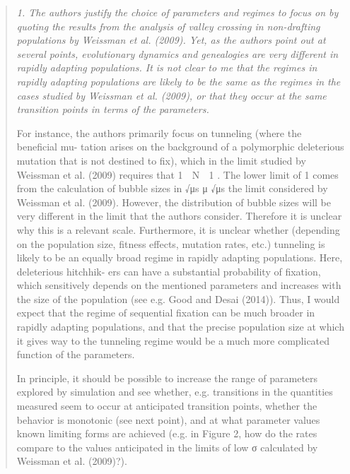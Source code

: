 \documentclass[11pt]{article}
\newenvironment{reviewerquote}{\begin{quote}\color{black}\itshape}{\end{quote}}
\begin{document}
\begin{reviewerquote}
1. The authors justify the choice of parameters and regimes to focus on by quoting the results from the analysis of valley crossing in non-drafting populations by Weissman et al. (2009). Yet, as the authors point out at several points, evolutionary dynamics and genealogies are very different in rapidly adapting populations. It is not clear to me that the regimes in rapidly adapting populations are likely to be the same as the regimes in the cases studied by Weissman et al. (2009), or that they occur at the same transition points in terms of the parameters.

For instance, the authors primarily focus on tunneling (where the beneficial mu- tation arises on the background of a polymorphic deleterious mutation that is not destined to fix), which in the limit studied by Weissman et al. (2009) requires that 1 􏰀 N 􏰀 1 . The lower limit of 1 comes from the calculation of bubble sizes in √μs μ √μs
the limit considered by Weissman et al. (2009). However, the distribution of bubble sizes will be very different in the limit that the authors consider. Therefore it is unclear why this is a relevant scale. Furthermore, it is unclear whether (depending on the population size, fitness effects, mutation rates, etc.) tunneling is likely to be an equally broad regime in rapidly adapting populations. Here, deleterious hitchhik- ers can have a substantial probability of fixation, which sensitively depends on the mentioned parameters and increases with the size of the population (see e.g. Good and Desai (2014)). Thus, I would expect that the regime of sequential fixation can be much broader in rapidly adapting populations, and that the precise population size at which it gives way to the tunneling regime would be a much more complicated function of the parameters.

In principle, it should be possible to increase the range of parameters explored by simulation and see whether, e.g. transitions in the quantities measured seem to occur at anticipated transition points, whether the behavior is monotonic (see next point), and at what parameter values known limiting forms are achieved (e.g. in Figure 2, how do the rates compare to the values anticipated in the limits of low σ calculated by Weissman et al. (2009)?).
\end{reviewerquote}
\end{document}
